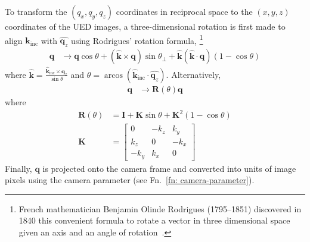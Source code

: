 To transform the $(q_x, q_y, q_z)$ coordinates in reciprocal space to the $(x, y, z)$ coordinates
of the UED images, a three-dimensional rotation is first made to align $\boldsymbol{k}_\text{inc}$
with $\hat{\boldsymbol{q}_z}$ using Rodrigues' rotation formula,%
\footnote{French mathematician Benjamin Olinde Rodrigues (1795--1851) discovered in 1840
this convenient formula to rotate a vector in three dimensional space
given an axis and an angle of rotation~\cite{Murray1994}.}
%
\begin{equation}
  \begin{aligned}
    \boldsymbol{q}
      & \rightarrow \boldsymbol{q} \cos \theta
        + (\hat{\boldsymbol{k}} \times \boldsymbol{q}) \sin \theta_\perp
        + \hat{\boldsymbol{k}} (\hat{\boldsymbol{k}} \cdot \boldsymbol{q}) (1 - \cos \theta)
  \end{aligned}
  \label{eq: rodrigues1}
\end{equation}
%
where $\hat{\boldsymbol{k}} = \frac{\hat{\boldsymbol{k}}_\text{inc} \times \hat{\boldsymbol{q}}_z}{ \sin \theta}$
and $\theta = \operatorname{arcos}(\hat{\boldsymbol{k}}_\text{inc} \cdot \hat{\boldsymbol{q}_z})$.
%
Alternatively,
%
%
\begin{equation}
  \begin{aligned}
    \boldsymbol{q} & \rightarrow \mathbf{R}(\theta) \boldsymbol{q}
  \end{aligned}
  \label{eq: rodrigues2}
\end{equation}
%
where
%
\begin{equation}
  \begin{aligned}
    \mathbf{R}(\theta) & = \mathbf{I} + \mathbf{K} \sin \theta  + \mathbf{K}^2 (1 - \cos \theta) \\
    \mathbf{K} & =
      \begin{bmatrix}
          0 & -k_z & k_y \\
          k_z & 0 & -k_x \\
          -k_y & k_x & 0
      \end{bmatrix}
  \end{aligned}
  \label{eq: rodrigues3}
\end{equation}
%
Finally, $\boldsymbol{q}$ is projected onto the camera frame and converted into units of image pixels
using the camera parameter (see Fn.~\ref{fn: camera-parameter}).

